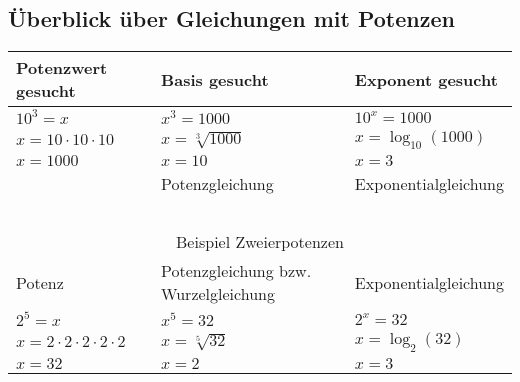 

\subsection{Überblick über Gleichungen mit Potenzen}

\begin{tabular}{|p{52mm}|p{52mm}|p{52mm}|}
  \hline
  Potenzwert gesucht       & Basis gesucht                       &  Exponent gesucht          \\
  \hline
  $10^3=x$                 & $x^3=1000$                           &  $10^x=1000$               \\
  \hline
  $x=10\cdot{}10\cdot{}10$ & $x=\sqrt[3]{1000}$                   & $x =  \log_{10}(1000)$     \\
  $x=1000$                 & $x=10$                               & $x =  3$                   \\
                           & Potenzgleichung                      & Exponentialgleichung       \\



  \hline
  \multicolumn{3}{c}{\,}\\ %
  \multicolumn{3}{c}{Beispiel Zweierpotenzen}\\
  \hline
  Potenz                   & Potenzgleichung bzw. Wurzelgleichung &  Exponentialgleichung     \\
  \hline 
  $2^5=x$                  & $x^5=32$                             &  $2^x=32$                  \\
  \hline
  $x=2\cdot{}2\cdot{}2\cdot{}2\cdot{2}$ & $x=\sqrt[5]{32}$        & $x =  \log_{2}(32)$        \\
  $x=32$                   & $x=2$                                & $x  =  3$                  \\
  \hline



\end{tabular}
